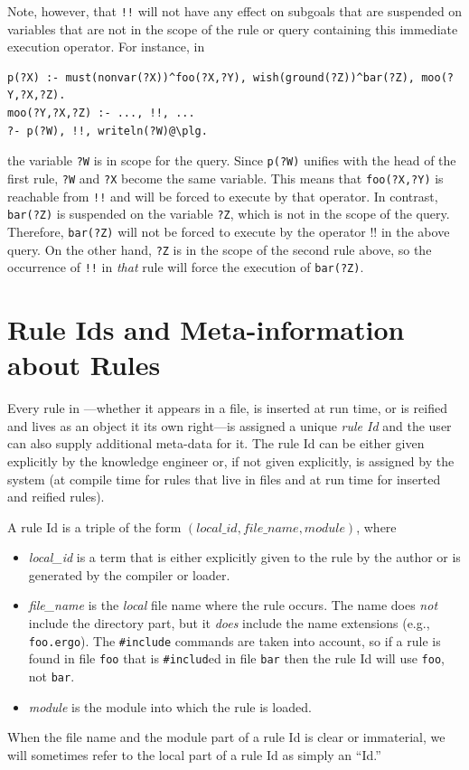 \documentclass[11pt]{article}
\newcommand{\ERGO}{\mbox{\smaller{\ensuremath{\cal{E}}\smaller{{\sc{RGO}}}}}\xspace}
\newcommand{\FLSYSTEM}{\ERGO}
\newcommand{\ergoext}{ergo\xspace}
\begin{document}
Note, however, that \texttt{!!} will not have any effect on subgoals that
are suspended on variables that are not in the scope of the rule or query
containing this
immediate execution operator. For instance, in
\begin{verbatim}
p(?X) :- must(nonvar(?X))^foo(?X,?Y), wish(ground(?Z))^bar(?Z), moo(?Y,?X,?Z).
moo(?Y,?X,?Z) :- ..., !!, ...
?- p(?W), !!, writeln(?W)@\plg.
\end{verbatim}
the variable \texttt{?W} is in scope for the query. Since
\texttt{p(?W)} unifies with the head of the first rule, \texttt{?W} and
\texttt{?X} become the same variable. This means that \texttt{foo(?X,?Y)}
is reachable from \texttt{!!} and will be forced to execute by that operator.
In contrast, \texttt{bar(?Z)} is suspended on the variable \texttt{?Z},
which is not in the scope of the query. Therefore, \texttt{bar(?Z)} will
not be forced to execute by the operator !! in the above query.   
On the other hand, \texttt{?Z} is in the scope of the second rule above, so
the occurrence of \texttt{!!} in \emph{that} rule will force the execution of
\texttt{bar(?Z)}.   


\section{Rule Ids and Meta-information about Rules}
\label{sec-rule-id}

Every rule in \FLSYSTEM---whether it appears in a file, is inserted at run
time, or is reified and lives as an object it its own right---is assigned a
unique \emph{rule Id} and the user can also supply additional
meta-data for it. The rule Id can be either given explicitly by the
knowledge engineer or, if not given explicitly, is assigned by the system (at compile time for
rules that live in files and at run time for inserted and reified rules).

\noindent
A rule Id is a triple of the form
$(local\_id,file\_name,module)$, where
\begin{itemize}
\item \emph{local\_id} is a term that is either explicitly given to the rule
  by the author or is generated by the compiler or loader.
\item \emph{file\_name} is the \emph{local}
  file name where the rule occurs. The name
  does \emph{not} include the directory part, but it \emph{does}
  include the name
  extensions (e.g., \texttt{foo.\ergoext}). The \texttt{\#include} commands are
  taken into account, so if a rule is found in file \texttt{foo} that is
  \texttt{\#includ}ed in file \texttt{bar} then the rule Id will use
  \texttt{foo}, not \texttt{bar}.
\item \emph{module} is the module into which the rule is loaded. 
\end{itemize}
When the file name and the module part of a rule Id is clear or immaterial,
we will sometimes refer to the local part of a rule Id as simply an ``Id.''
\end{document}

